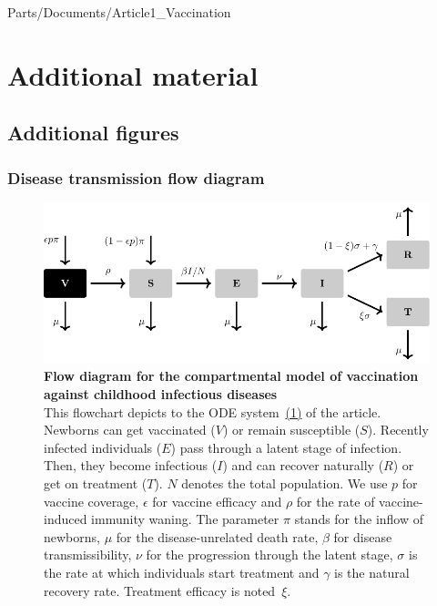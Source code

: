 
		{Parts/Documents/Article1_Vaccination}

\section{Additional material}
\label{Vaccine:Appendix}
\subsection{Additional figures}

\subsubsection{Disease transmission flow diagram}
\begin{figure}[H]
	\centering
	\includegraphics[width=0.8\linewidth]{Figures/Vaccine/Tikz_FlowDiagram/FlowDiagram}
	\caption[Flow diagram for the compartmental model of vaccination against childhood infectious diseases]{%
	       {\bf Flow diagram for the compartmental model of vaccination against childhood infectious diseases}\\
	This flowchart depicts to the ODE system~\hyperlink{Article1.2}{(1)} of the article. Newborns can get vaccinated ($V$) or remain susceptible ($S$). Recently infected individuals ($E$) pass through a latent stage of infection. Then, they become infectious ($I$) and can recover naturally ($R$) or get on treatment ($T$). $N$ denotes the total population. We use $p$ for vaccine coverage, $\epsilon$ for vaccine efficacy and $\rho$ for the rate of vaccine-induced immunity waning. The parameter $\pi$  stands for the inflow of newborns, $\mu$ for the disease-unrelated death rate, $\beta$ for disease transmissibility, $\nu$ for the progression through the latent stage, $\sigma$ is the rate at which individuals start treatment and $\gamma$ is the natural recovery rate. Treatment efficacy is noted~$\xi$.
}
	\label{fig:Vaccine_FlowDiag}
\end{figure}

